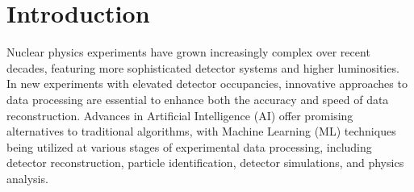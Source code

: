 \documentclass[preprint,12pt]{elsarticle}
\begin{document}
\begin{abstract}

\end{abstract}
\maketitle

\section{Introduction}
\indent
Nuclear physics experiments have grown increasingly complex over recent decades, featuring more sophisticated detector systems and higher luminosities. In new experiments with elevated detector occupancies, innovative approaches to data processing are essential to enhance both the accuracy and speed of data reconstruction. Advances in Artificial Intelligence (AI) offer promising alternatives to traditional algorithms, with Machine Learning (ML) techniques being utilized at various stages of experimental data processing, including detector reconstruction, particle identification, detector simulations, and physics analysis.
\end{document}
